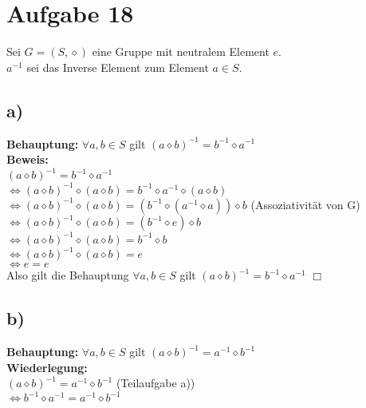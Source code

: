 \documentclass[paper = a4, ngerman]{scrartcl}
\begin{document}
	
	
	\section*{Aufgabe 18}
	
	Sei $G = (S,\diamond)$ eine Gruppe mit neutralem Element $e$.\\
	$a^{-1}$ sei das Inverse Element zum Element $a \in S$.\\
	
	\subsection*{a)}
	\textbf{Behauptung:} $\forall a,b \in S$ gilt $ (a \diamond b)^{-1} = b^{-1} \diamond a^{-1}$\\
	
	\textbf{Beweis:}\\
	$ (a \diamond b)^{-1} = b^{-1} \diamond a^{-1}$\\
	$\Leftrightarrow (a \diamond b)^{-1} \diamond (a \diamond b)= b^{-1} \diamond a^{-1} \diamond(a \diamond b)$\\
	$\Leftrightarrow (a \diamond b)^{-1} \diamond (a \diamond b)= (b^{-1} \diamond (a^{-1} \diamond a)) \diamond b$ \hspace{10mm} (Assoziativität von G)\\
	$\Leftrightarrow (a \diamond b)^{-1} \diamond (a \diamond b)= (b^{-1} \diamond e) \diamond b$\\
	$\Leftrightarrow (a \diamond b)^{-1} \diamond (a \diamond b)= b^{-1} \diamond b$\\
	$\Leftrightarrow (a \diamond b)^{-1} \diamond (a \diamond b)= e$\\
	$\Leftrightarrow e= e$\\
	
	Also gilt die Behauptung $\forall a,b \in S$ gilt $ (a \diamond b)^{-1} = b^{-1} \diamond a^{-1}$
	\hfill$\Box$\\
	
	\subsection*{b)}
	\textbf{Behauptung:} $\forall a,b \in S$ gilt $ (a \diamond b)^{-1} = a^{-1} \diamond b^{-1}$\\
	
	\textbf{Wiederlegung:}\\
	$ (a \diamond b)^{-1} = a^{-1} \diamond b^{-1}$  (Teilaufgabe a))\\
	$\Leftrightarrow b^{-1} \diamond a^{-1} = a^{-1} \diamond b^{-1}$\\
	
\end{document}
